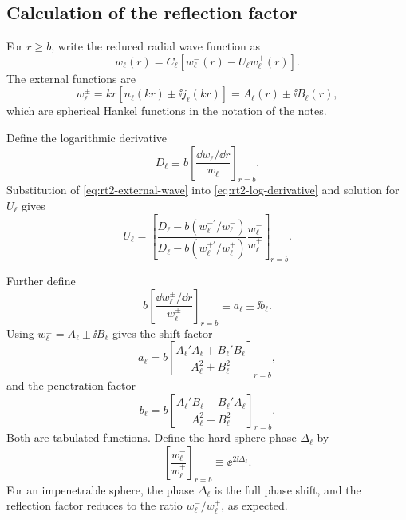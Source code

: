 \subsection*{Calculation of the reflection factor}
For $r\ge b$, write the reduced radial wave function as
\begin{equation*}
  w_\ell(r)=C_\ell\left[w_\ell^-(r)-U_\ell w_\ell^+(r)\right].
  \tag{13}\label{eq:rt2-external-wave}
\end{equation*}
The external functions are
\begin{equation*}
  w_\ell^\pm=kr\left[n_\ell(kr)\pm\ii j_\ell(kr)\right]
  =A_\ell(r)\pm\ii B_\ell(r),
  \tag{13b}
\end{equation*}
which are spherical Hankel functions in the notation of the notes.

Define the logarithmic derivative
\begin{equation*}
  D_\ell\equiv b\left[\frac{\dd w_\ell/\dd r}{w_\ell}\right]_{r=b}.
  \tag{14}\label{eq:rt2-log-derivative}
\end{equation*}
Substitution of \eqref{eq:rt2-external-wave} into \eqref{eq:rt2-log-derivative} and solution for $U_\ell$ gives
\begin{equation*}
  U_\ell
  =\left[
  \frac{D_\ell-b(w_\ell^{-\prime}/w_\ell^-)}
  {D_\ell-b(w_\ell^{+\prime}/w_\ell^+)}
  \frac{w_\ell^-}{w_\ell^+}
  \right]_{r=b}.
  \tag{15}
\end{equation*}

Further define
\begin{equation*}
  b\left[\frac{\dd w_\ell^\pm/\dd r}{w_\ell^\pm}\right]_{r=b}
  \equiv a_\ell\pm\ii b_\ell.
  \tag{16}
\end{equation*}
Using $w_\ell^\pm=A_\ell\pm\ii B_\ell$ gives the shift factor
\begin{equation*}
  a_\ell
  =b\left[
  \frac{A_\ell'A_\ell+B_\ell'B_\ell}
  {A_\ell^2+B_\ell^2}
  \right]_{r=b},
  \tag{17}
\end{equation*}
and the penetration factor
\begin{equation*}
  b_\ell
  =b\left[
  \frac{A_\ell'B_\ell-B_\ell'A_\ell}
  {A_\ell^2+B_\ell^2}
  \right]_{r=b}.
  \tag{18}
\end{equation*}
Both are tabulated functions.  Define the hard-sphere phase $\Delta_\ell$ by
\begin{equation*}
  \left[\frac{w_\ell^-}{w_\ell^+}\right]_{r=b}
  \equiv\ee^{2\ii\Delta_\ell}.
  \tag{19}
\end{equation*}
For an impenetrable sphere, the phase $\Delta_\ell$ is the full phase shift, and the reflection factor reduces to the ratio $w_\ell^-/w_\ell^+$, as expected.

